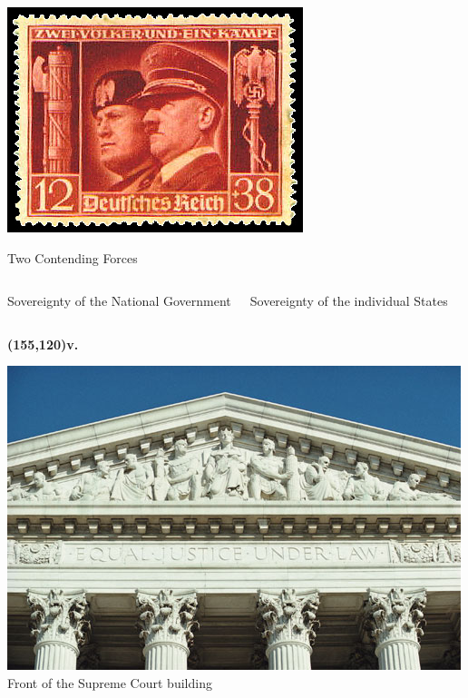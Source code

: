 \begin{frame}
    \centering
    \includegraphics[width=.9\textwidth]{img/reich-stamp.png} \\
\end{frame}

\begin{frame}{Two Contending Forces}
    \begin{columns}[onlytextwidth]
            \begin{varblock}[0.9\textwidth]{}\huge{ \centering Sovereignty of the National Government \\}\end{varblock}

            \begin{varblock}[0.9\textwidth]{}\huge{ \centering Sovereignty of the individual States \\}\end{varblock}
    \end{columns}
    \textbf{\huge{ \color{red}
        \Put(155,120){v.}
    }}
\end{frame}

\begin{frame}
    \centering
    \includegraphics[width=.9\textwidth]{img/supremecourtfasces.jpg} \\
    \large{ Front of the Supreme Court building } \\
\end{frame}

